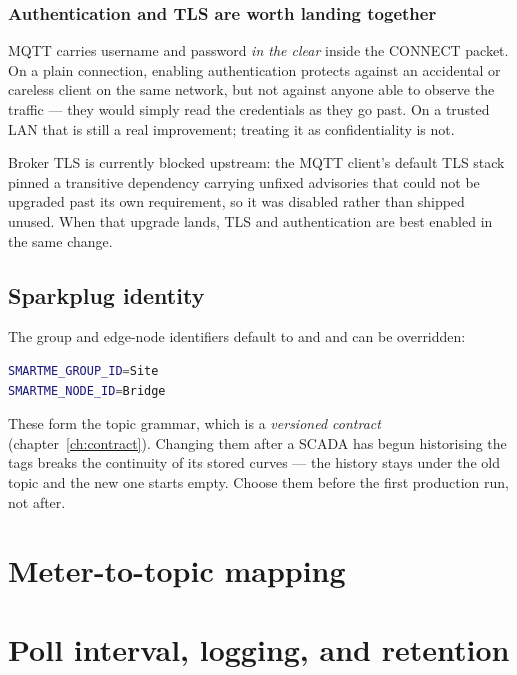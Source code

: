 \subsubsection*{Authentication and TLS are worth landing together}

MQTT carries username and password \emph{in the clear} inside the CONNECT packet. On a
plain connection, enabling authentication protects against an accidental or careless
client on the same network, but not against anyone able to observe the traffic --- they
would simply read the credentials as they go past. On a trusted LAN that is still a real
improvement; treating it as confidentiality is not.

Broker TLS is currently blocked upstream: the MQTT client's default TLS stack pinned a
transitive dependency carrying unfixed advisories that could not be upgraded past its own
requirement, so it was disabled rather than shipped unused. When that upgrade lands, TLS
and authentication are best enabled in the same change.

\subsection{Sparkplug identity}

The group and edge-node identifiers default to  and  and can be
overridden:

\begin{lstlisting}[language=bash]
SMARTME_GROUP_ID=Site
SMARTME_NODE_ID=Bridge
\end{lstlisting}

\begin{warning}
These form the topic grammar, which is a \emph{versioned contract} (chapter~\ref{ch:contract}).
Changing them after a SCADA has begun historising the tags breaks the continuity of its
stored curves --- the history stays under the old topic and the new one starts empty.
Choose them before the first production run, not after.
\end{warning}

\section{Meter-to-topic mapping}

\section{Poll interval, logging, and retention}
